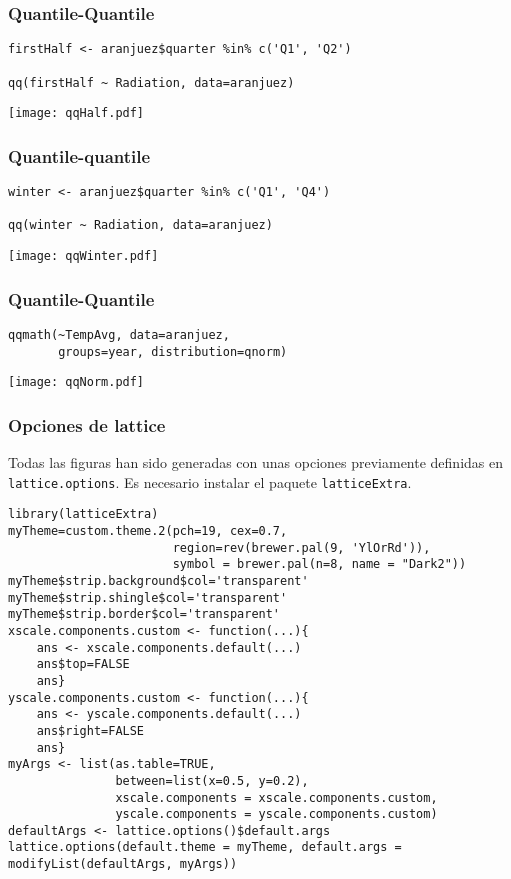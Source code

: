 \documentclass[xcolor={usenames,svgnames,dvipsnames}]{beamer}
\begin{document}
\begin{frame}[fragile]
\frametitle{Quantile-Quantile}
\label{sec-2-1-25}


\lstset{language=R}
\begin{lstlisting}
firstHalf <- aranjuez$quarter %in% c('Q1', 'Q2')

qq(firstHalf ~ Radiation, data=aranjuez)
\end{lstlisting}

\texttt{[image: qqHalf.pdf]}
\end{frame}
\begin{frame}[fragile]
\frametitle{Quantile-quantile}
\label{sec-2-1-26}


\lstset{language=R}
\begin{lstlisting}
winter <- aranjuez$quarter %in% c('Q1', 'Q4')

qq(winter ~ Radiation, data=aranjuez)
\end{lstlisting}

\texttt{[image: qqWinter.pdf]}
\end{frame}
\begin{frame}[fragile]
\frametitle{Quantile-Quantile}
\label{sec-2-1-27}


\lstset{language=R}
\begin{lstlisting}
qqmath(~TempAvg, data=aranjuez,
       groups=year, distribution=qnorm)
\end{lstlisting}

\texttt{[image: qqNorm.pdf]}
\end{frame}
\begin{frame}[fragile]
\frametitle{Opciones de lattice}
\label{sec-2-1-28}

Todas las figuras han sido generadas con unas opciones previamente
definidas en \texttt{lattice.options}. Es necesario instalar el paquete
\texttt{latticeExtra}.

\lstset{language=R}
\begin{lstlisting}
library(latticeExtra)
myTheme=custom.theme.2(pch=19, cex=0.7,
                       region=rev(brewer.pal(9, 'YlOrRd')),
                       symbol = brewer.pal(n=8, name = "Dark2"))
myTheme$strip.background$col='transparent'
myTheme$strip.shingle$col='transparent'
myTheme$strip.border$col='transparent'
xscale.components.custom <- function(...){
    ans <- xscale.components.default(...)
    ans$top=FALSE
    ans}
yscale.components.custom <- function(...){
    ans <- yscale.components.default(...)
    ans$right=FALSE
    ans}
myArgs <- list(as.table=TRUE,
               between=list(x=0.5, y=0.2),
               xscale.components = xscale.components.custom,
               yscale.components = yscale.components.custom)
defaultArgs <- lattice.options()$default.args
lattice.options(default.theme = myTheme, default.args = modifyList(defaultArgs, myArgs))
\end{lstlisting}
\end{frame}
\end{document}
